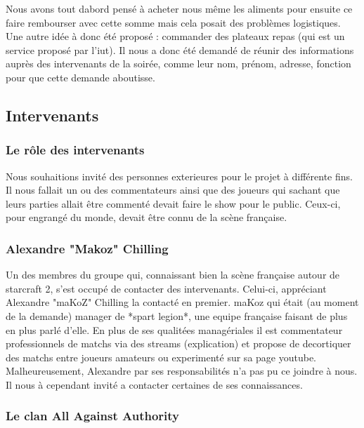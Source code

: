 Nous avons tout dabord pensé à acheter nous même les aliments pour
ensuite ce faire rembourser avec cette somme mais cela posait des
problèmes logistiques. Une autre idée à donc été proposé : commander des
plateaux repas (qui est un service proposé par l'iut). Il nous a donc
été demandé de réunir des informations auprès des intervenants de la
soirée, comme leur nom, prénom, adresse, fonction pour que cette demande
aboutisse.

\subsection{Intervenants}%
\label{sub:intervenants}

\subsubsection{Le rôle des intervenants}%
\label{ssub:le_role_des_intervenants}

Nous souhaitions invité des personnes exterieures pour le projet à
différente fins. Il nous fallait un ou des commentateurs ainsi que des
joueurs qui sachant que leurs parties allait être commenté devait faire
le show pour le public. Ceux-ci, pour engrangé du monde, devait être
connu de la scène française.

\subsubsection{Alexandre "Makoz" Chilling}%
\label{ssub:alexandre_makoz_chilling}

Un des membres du groupe qui, connaissant bien la scène française autour
de starcraft 2, s'est occupé de contacter des intervenants.  Celui-ci,
appréciant Alexandre "maKoZ" Chilling la contacté en premier.  maKoz qui
était (au moment de la demande) manager de *spart legion*, une equipe
française faisant de plus en plus parlé d'elle. En plus de ses qualitées
managériales il est commentateur professionnels de matchs via des
streams (explication) et propose de decortiquer des matchs entre joueurs
amateurs ou experimenté sur sa page youtube. Malheureusement, Alexandre
par ses responsabilités n'a pas pu ce joindre à nous. Il nous à
cependant invité a contacter certaines de ses connaissances.

\subsubsection{Le clan All Against Authority}%
\label{ssub:le_clan_all_against_authority}

